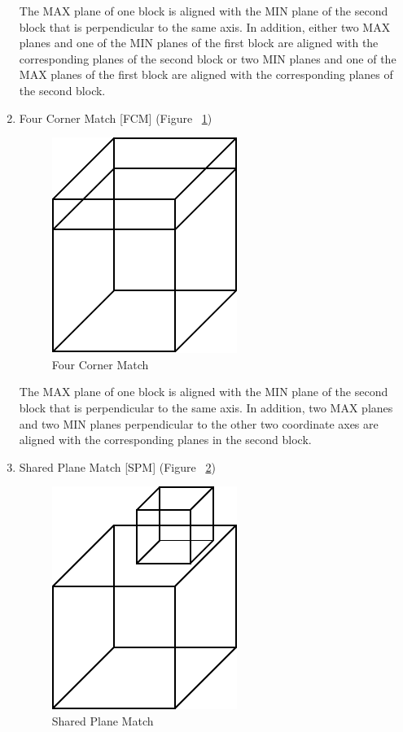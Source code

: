\begin{enumerate}
		The MAX plane of one block is aligned with the MIN plane of the second 
        block that is perpendicular to the same axis. In addition, either
		two MAX planes and one of the MIN planes of the first block are
		aligned with the corresponding planes of the second block or
		two MIN planes and one of the MAX planes of the first block are
		aligned with the corresponding planes of the second block.
 
	\item
	Four Corner Match [FCM]	(Figure ~\ref{fcm})

        \begin{figure}[htbp]
	\hspace{4cm}
	\includegraphics{FCM.pdf}
	\caption{Four Corner Match}
            \label{fcm}
        \end{figure}
 
		The MAX plane of one block is aligned with the MIN plane of the second 
        block that is perpendicular to the same axis. In addition, two MAX
		planes and two MIN planes perpendicular to the other two coordinate 
		axes are aligned with the corresponding planes in the second block.

	\item
	Shared Plane Match [SPM] (Figure ~\ref{spm})

        \begin{figure}[htbp]
	\hspace{4cm}
	\includegraphics{SPM.pdf}
	\caption{Shared Plane Match}
            \label{spm}
        \end{figure}
 

\end{enumerate}
